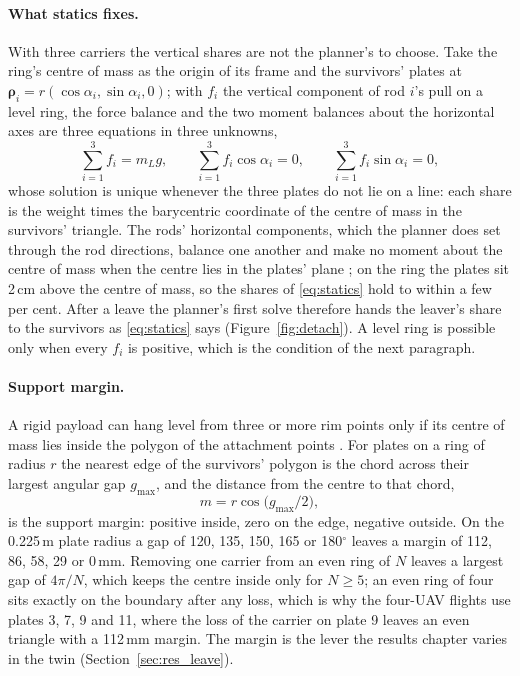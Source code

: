 \paragraph{What statics fixes.} With three carriers the vertical shares are not the planner's to choose. Take the
ring's centre of mass as the origin of its frame and the survivors' plates at $\boldsymbol{\rho}_i = r(\cos\alpha_i,
\sin\alpha_i, 0)$; with $f_i$ the vertical component of rod $i$'s pull on a level ring, the force balance and the
two moment balances about the horizontal axes are three equations in three unknowns,
\begin{equation}
    \sum_{i=1}^{3} f_i = m_L g, \qquad \sum_{i=1}^{3} f_i \cos\alpha_i = 0, \qquad \sum_{i=1}^{3} f_i \sin\alpha_i = 0,
    \label{eq:statics}
\end{equation}
whose solution is unique whenever the three plates do not lie on a line: each share is the weight times the
barycentric coordinate of the centre of mass in the survivors' triangle. The rods' horizontal components, which the
planner does set through the rod directions, balance one another and make no moment about the centre of mass when
the centre lies in the plates' plane \cite{michael2011cooperative, tognon2018internal}; on the
ring the plates sit 2\,cm above the centre of mass, so the shares of \eqref{eq:statics} hold to within a few per
cent. After a leave the planner's first solve therefore hands the leaver's share to the survivors as
\eqref{eq:statics} says (Figure~\ref{fig:detach}). A level ring is possible only when every $f_i$ is positive, which
is the condition of the next paragraph.

\paragraph{Support margin.} A rigid payload can hang level from three or more rim points only if its centre of mass
lies inside the polygon of the attachment points \cite{michael2011cooperative}. For plates on a ring of radius $r$
the nearest edge of the survivors' polygon is the chord across their largest angular gap $g_{\max}$, and the
distance from the centre to that chord,
\begin{equation}
    m = r \cos\!\big(g_{\max}/2\big),
    \label{eq:margin}
\end{equation}
is the support margin: positive inside, zero on the edge, negative outside. On the 0.225\,m plate radius a gap of
120, 135, 150, 165 or 180$^\circ$ leaves a margin of 112, 86, 58, 29 or 0\,mm. Removing one carrier from an even
ring of $N$ leaves a largest gap of $4\pi/N$, which keeps the centre inside only for $N \ge 5$; an even ring of
four sits exactly on the boundary after any loss, which is why the four-UAV flights use plates 3, 7, 9 and 11,
where the loss of the carrier on plate 9 leaves an even triangle with a 112\,mm margin. The margin is the lever the
results chapter varies in the twin (Section~\ref{sec:res_leave}).

